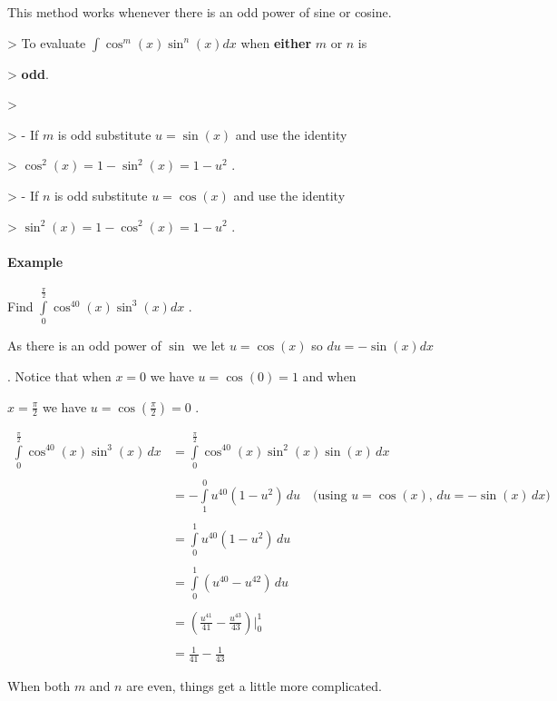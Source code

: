 This method works whenever there is an odd power of sine or cosine.



> To evaluate $\int\cos^m(x)\sin^n(x)dx$ when \textbf{either} $m$ or $n$ is

> \textbf{odd}.

>

> -   If $m$ is odd substitute $u=\sin(x)$ and use the identity

>     $\cos^2(x)=1-\sin^2(x)=1-u^2$ .

> -   If $n$ is odd substitute $u=\cos(x)$ and use the identity

>     $\sin^2(x)=1-\cos^2(x)=1-u^2$ .



\paragraph{Example}



Find $\int\limits _0^\frac{\pi}{2} \cos^{40}(x)\sin^3(x)dx$ .



As there is an odd power of $\sin$ we let $u=\cos(x)$ so $du=-\sin(x)dx$

. Notice that when $x=0$ we have $u=\cos(0)=1$ and when

$x=\frac{\pi}{2}$ we have $u=\cos(\tfrac{\pi}{2})=0$ .



\begin{align} \int\limits _0^\frac{\pi}{2} \cos^{40}(x)\sin^3(x)\,dx  &= \int\limits _0^\frac{\pi}{2} \cos^{40}(x)\sin^2(x)\sin(x)\,dx \\\\ &= -\int\limits _1^0 u^{40}(1-u^2)\,du \quad \text{(using $u = \cos(x)$, $du = -\sin(x)\,dx$)} \\\\ &= \int\limits _0^1 u^{40}(1-u^2)\,du \\\\ &= \int\limits _0^1 \left(u^{40} - u^{42}\right)\,du \\\\ &= \left(\frac{u^{41}}{41} - \frac{u^{43}}{43}\right)\Bigg| _0^1 \\\\ &= \frac{1}{41} - \frac{1}{43} \end{align}



When both $m$ and $n$ are even, things get a little more complicated.



